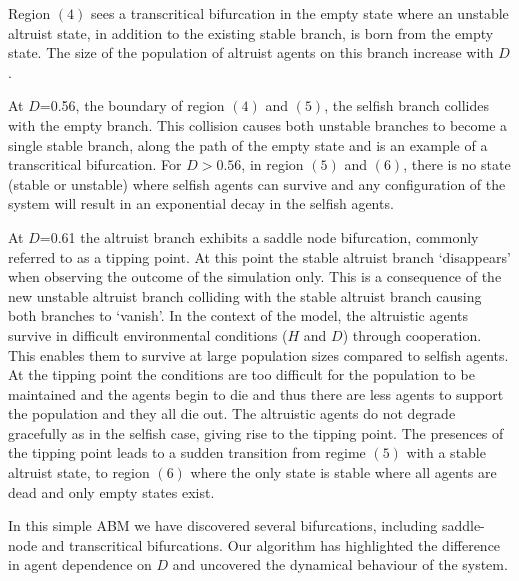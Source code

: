 \documentclass[11pt]{article}
\begin{document}
Region $(4)$ sees a transcritical bifurcation in the empty state where an unstable altruist state, in addition to the existing stable branch, is born from the empty state. The size of the population of altruist agents on this branch increase with $D$.

At $D$=0.56, the boundary of region $(4)$ and $(5)$, the selfish branch collides with the empty branch. This collision causes both unstable branches to become a single stable branch, along the path of the empty state and is an example of a transcritical bifurcation. For $D>0.56$, in region $(5)$ and $(6)$, there is no state (stable or unstable) where selfish agents can survive and any configuration of the system will result in an exponential decay in the selfish agents. 

At $D$=0.61 the altruist branch exhibits a saddle node bifurcation, commonly referred to as a tipping point. At this point the stable altruist branch `disappears' when observing the outcome of the simulation only. This is a consequence of the new unstable altruist branch colliding with the stable altruist branch causing both branches to `vanish'. In the context of the model, the altruistic agents survive in difficult environmental conditions ($H$ and $D$) through cooperation. This enables them to survive at large population sizes compared to selfish agents. At the tipping point the conditions are too difficult for the population to be maintained and the agents begin to die and thus there are less agents to support the population and they all die out. The altruistic agents do not degrade gracefully as in the selfish case, giving rise to the tipping point. The presences of the tipping point leads to a sudden transition from regime $(5)$ with a stable altruist state, to region $(6)$ where the only state is stable where all agents are dead and only empty states exist. 

In this simple ABM we have discovered several bifurcations, including saddle-node and transcritical bifurcations. Our algorithm has highlighted the difference in agent dependence on $D$ and uncovered the dynamical behaviour of the system. 
\end{document}
